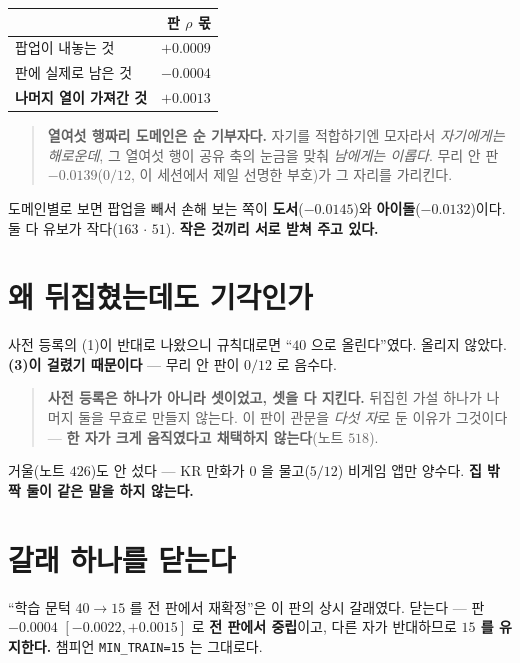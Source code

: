 \documentclass[11pt]{article}
\begin{document}
\begin{center}
\begin{tabular}{lr}
\hline
 & 판 $\rho$ 몫 \\
\hline
팝업이 내놓는 것 & $+0.0009$ \\
판에 실제로 남은 것 & $\mathbf{-0.0004}$ \\
\hline
\textbf{나머지 열이 가져간 것} & $\mathbf{+0.0013}$ \\
\hline
\end{tabular}
\end{center}

\begin{quote}
\textbf{열여섯 행짜리 도메인은 순 기부자다.} 자기를 적합하기엔 모자라서
\emph{자기에게는 해로운데}, 그 열여섯 행이 공유 축의 눈금을 맞춰
\emph{남에게는 이롭다}. 무리 안 판 $-0.0139$($0/12$, 이 세션에서 제일
선명한 부호)가 그 자리를 가리킨다.
\end{quote}

도메인별로 보면 팝업을 빼서 손해 보는 쪽이 \textbf{도서}($-0.0145$)와
\textbf{아이돌}($-0.0132$)이다. 둘 다 유보가 작다($163$ $\cdot$ $51$).
\textbf{작은 것끼리 서로 받쳐 주고 있다.}

\section{왜 뒤집혔는데도 기각인가}

사전 등록의 (1)이 반대로 나왔으니 규칙대로면 ``$40$ 으로 올린다''였다.
올리지 않았다. \textbf{(3)이 걸렸기 때문이다} --- 무리 안 판이 $0/12$ 로
음수다.

\begin{quote}
\textbf{사전 등록은 하나가 아니라 셋이었고, 셋을 다 지킨다.} 뒤집힌
가설 하나가 나머지 둘을 무효로 만들지 않는다. 이 판이 관문을 \emph{다섯
자}로 둔 이유가 그것이다 --- \textbf{한 자가 크게 움직였다고 채택하지
않는다}(노트 $518$).
\end{quote}

거울(노트 $426$)도 안 섰다 --- KR 만화가 $0$ 을 물고($5/12$) 비게임 앱만
양수다. \textbf{집 밖 짝 둘이 같은 말을 하지 않는다.}

\section*{갈래 하나를 닫는다}

``학습 문턱 $40 \to 15$ 를 전 판에서 재확정''은 이 판의 상시 갈래였다.
닫는다 --- 판 $-0.0004$ $[-0.0022,+0.0015]$ 로 \textbf{전 판에서
중립}이고, 다른 자가 반대하므로 \textbf{$15$ 를 유지한다.} 챔피언
\texttt{MIN\_TRAIN=15} 는 그대로다.
\end{document}
